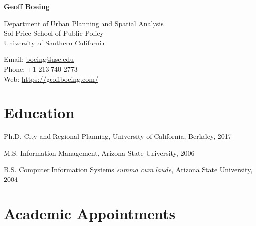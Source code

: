 \documentclass[12pt,letterpaper]{report}
\newcommand{\myname}{Geoff Boeing}
\newcommand{\namefont}[1]{{\normalfont\bfseries\Huge{#1}}}
\begin{document}
    \raggedright

    \namefont{\myname}

    \vspace{1em}
    \begin{minipage}[t]{0.68\textwidth}
        Department of Urban Planning and Spatial Analysis \\
        Sol Price School of Public Policy \\
        University of Southern California
    \end{minipage}
    \begin{minipage}[t]{0.31\textwidth}
        Email: \href{mailto:boeing@usc.edu}{boeing@usc.edu} \\
        Phone: +1 213 740 2773 \\
        Web: \href{https://geoffboeing.com/}{https://geoffboeing.com/}
    \end{minipage}
    \vspace{0.5em}



    \section*{Education}

    \begin{tablist}

        \item[Ph.D.] \tab City and Regional Planning, University of California, Berkeley, 2017

        \item[M.S.]  \tab Information Management, Arizona State University, 2006

        \item[B.S.]  \tab Computer Information Systems \textit{summa cum laude}, Arizona State University, 2004

    \end{tablist}



    \section*{Academic Appointments}
\end{document}
